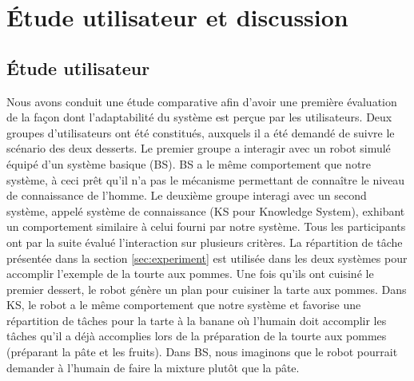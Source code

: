 \documentclass[a4paper,11pt,twoside]{StyleThese}
\begin{document}
\clearpage



 




\section{Étude utilisateur et discussion}
\label{study}

\subsection{Étude utilisateur}
Nous avons conduit une étude comparative afin d'avoir une première évaluation de la façon dont l'adaptabilité du système est perçue par les utilisateurs. Deux groupes d'utilisateurs ont été constitués, auxquels il a été demandé de suivre le scénario des deux desserts. Le premier groupe a interagir avec un robot simulé équipé d'un système basique (BS). BS a le même comportement que notre système, à ceci prêt qu'il n'a pas le mécanisme permettant de connaître le niveau de connaissance de l'homme. Le deuxième groupe interagi avec un second système, appelé système de connaissance (KS pour Knowledge System), exhibant un comportement similaire à celui fourni par notre système.
Tous les participants ont par la suite évalué l'interaction sur plusieurs critères.
%
La répartition de tâche présentée dans la section \ref{sec:experiment} 
est utilisée dans les deux systèmes pour accomplir l'exemple de la tourte aux pommes. Une fois qu'ils ont cuisiné le premier dessert, le robot génère un plan pour cuisiner la tarte aux pommes. Dans KS, le robot a le même comportement que notre système et favorise une répartition de tâches pour la tarte à la banane où l'humain doit accomplir les tâches qu'il a déjà accomplies lors de la préparation de la tourte aux pommes (préparant la pâte et les fruits).
Dans BS, nous imaginons que le robot pourrait demander à l'humain de faire la mixture plutôt que la pâte.
\end{document}
